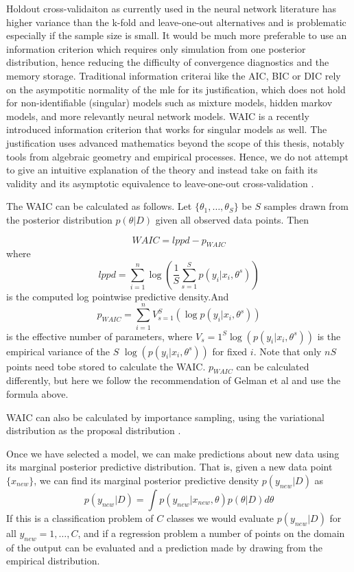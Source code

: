 \documentclass{book}
\begin{document}
\begin{enumerate}
Holdout cross-validaiton as currently used in the neural network literature
has higher variance than the k-fold and leave-one-out alternatives and is
problematic especially if the sample size is small. It would be much more
preferable to use an information criterion which requires only simulation from
one posterior distribution, hence reducing the difficulty of convergence
diagnostics and the memory storage. Traditional information criterai like the
AIC, BIC or DIC rely on the asympotitic normality of the mle for its
justification, which does not hold for non-identifiable (singular) models such
as mixture models, hidden markov models, and more relevantly neural network
models. WAIC is a recently introduced information criterion that works for
singular models as well. The justification uses advanced mathematics beyond the
scope of this thesis, notably tools from algebraic geometry and empirical
processes. Hence, we do not attempt to give an intuitive explanation of the
theory and instead take on faith its validity and its asymptotic equivalence to
leave-one-out cross-validation \cite{watanabe2010asymptotic}.

The WAIC can be calculated as follows. Let $\{\theta_1, \dots, \theta_S\}$ be $S$ samples drawn from the posterior distribution $p(\theta|D)$ given all observed data points. Then 

\[WAIC = lppd - p_{WAIC} \]
where 
\[lppd = \sum_{i=1}^n \log( \frac{1}{S} \sum_{s=1}^S p(y_i|x_i,\theta^s) ) \]
is the computed log pointwise predictive density.And 
\[p_{WAIC} = \sum_{i=1}^n V_{s=1}^S(\log p(y_i|x_i, \theta^s)) \]
is the effective number of parameters, where $V_s=1^S \log(p(y_i|x_i,\theta^s))$ is the empirical variance of the $S$  $\log(p(y_i|x_i,\theta^s))$ for fixed $i$. Note that only $nS$ points need tobe stored to calculate the WAIC. $p_{WAIC}$ can be calculated differently, but here we follow the recommendation of Gelman et al and use the formula above.

WAIC can also be calculated by importance sampling, using the variational distribution as the proposal distribution \cite{yamada2012information}.

Once we have selected a model, we can make predictions about new data using its marginal posterior predictive distribution. That is, given a new data point $\{x_{new}\}$, we can find its marginal posterior predictive density $p(y_{new}|D)$ as 
\[ p(y_{new}|D) = \int p(y_{new}|x_{new},\theta) p(\theta|D) d\theta \]
If this is a classification problem of $C$ classes we would evaluate $p(y_{new}|D)$ for all $y_{new}=1,\dots, C$, and if a regression problem a number of points on the domain of the output can be evaluated 
and a prediction made by drawing from the empirical distribution. 


\end{enumerate}
\end{document}
